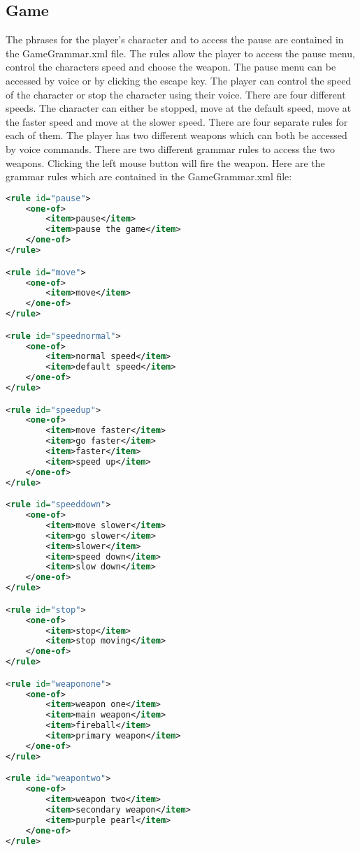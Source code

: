 \documentclass{article}
\begin{document}
\subsection{Game}
The phrases for the player's character and to access the pause are contained in the GameGrammar.xml file. The rules allow the player to access the pause menu, control the characters speed and choose the weapon. The pause menu can be accessed by voice or by clicking the escape key. The player can control the speed of the character or stop the character using their voice. There are four different speeds. The character can either be stopped, move at the default speed, move at the faster speed and move at the slower speed. There are four separate rules for each of them. The player has two different weapons which can both be accessed by voice commands. There are two different grammar rules to access the two weapons. Clicking the left mouse button will fire the weapon. Here are the grammar rules which are contained in the GameGrammar.xml file:
\begin{lstlisting}[language=XML]
<rule id="pause">
    <one-of>
        <item>pause</item>
        <item>pause the game</item>
    </one-of>
</rule>

<rule id="move">
    <one-of>
        <item>move</item>
    </one-of>
</rule>

<rule id="speednormal">
    <one-of>
        <item>normal speed</item>
        <item>default speed</item>
    </one-of>
</rule>

<rule id="speedup">
    <one-of>
        <item>move faster</item>
        <item>go faster</item>
        <item>faster</item>
        <item>speed up</item>
    </one-of>
</rule>

<rule id="speeddown">
    <one-of>
        <item>move slower</item>
        <item>go slower</item>
        <item>slower</item>
        <item>speed down</item>
        <item>slow down</item>
    </one-of>
</rule>

<rule id="stop">
    <one-of>
        <item>stop</item>
        <item>stop moving</item>
    </one-of>
</rule>

<rule id="weaponone">
    <one-of>
        <item>weapon one</item>
        <item>main weapon</item>
        <item>fireball</item>
        <item>primary weapon</item>
    </one-of>
</rule>

<rule id="weapontwo">
    <one-of>
        <item>weapon two</item>
        <item>secondary weapon</item>
        <item>purple pearl</item>
    </one-of>
</rule>
\end{lstlisting}
\end{document}
